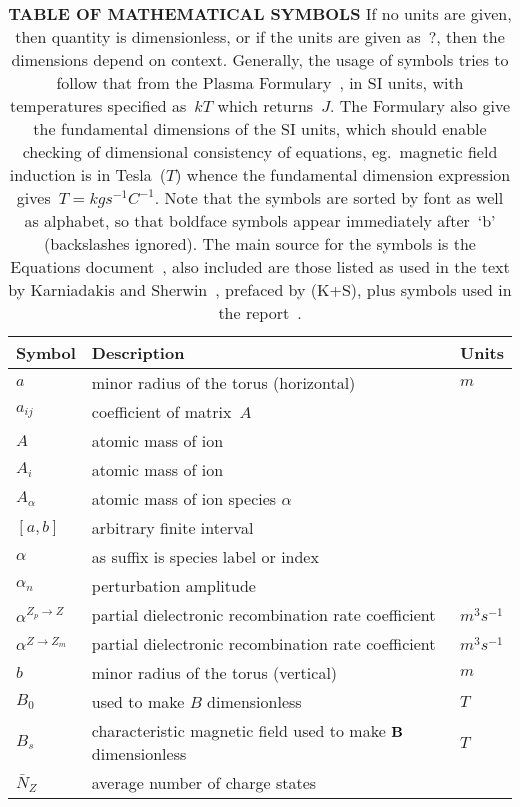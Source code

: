\begin{longtable}{|p{3.0cm}|p{10.0cm}|p{3.0cm}|}
\caption{\textbf{\textsf{TABLE OF MATHEMATICAL SYMBOLS}}
If no units are given, then quantity is dimensionless, or if the units are given as~$?$,
then the dimensions depend on context.
Generally, the usage of symbols tries to follow that from the Plasma Formulary~\cite{NRLpf07},
in SI units, with temperatures specified as~$kT$ which returns~$J$. The Formulary also
give the fundamental dimensions of the SI units, which should enable checking of dimensional consistency of
equations, eg.\ magnetic field induction is in Tesla~($T$) whence the fundamental
dimension expression gives~$T=kg s^{-1} C^{-1}$.
Note that the symbols are sorted by font as well as alphabet, so that boldface symbols
appear immediately after~`b' (backslashes ignored). The main source for the symbols is
the Equations document~\cite{pappeqs8}, also included are those listed as used in the text by
Karniadakis and Sherwin~\cite{karniadakissherwin}, prefaced by (K+S), plus symbols used in the
report~\cite{y2re313}. \label{tab:symbols}
} \\
\hline
\textbf{\textsf{Symbol}} & \textbf{\textsf{Description}}  & \textbf{\textsf{Units}} \\
\hline
$a$ & minor radius of the torus (horizontal) & $m$ \\
$a_{ij}$ & coefficient of matrix~$A$ &  \\
$A$ & atomic mass of ion &  \\
$A_i$ & atomic mass of ion & \\
$A_\alpha$ & atomic mass of ion species $\alpha$ & \\
$[a,b]$ & arbitrary finite interval  & \\
$\alpha$ & as suffix is species label or index &  \\
$\alpha_n$ & perturbation amplitude &  \\
$\alpha^{Z_p\rightarrow Z}$ & partial dielectronic recombination rate coefficient  & $m^3 s^{-1}$  \\
$\alpha^{Z\rightarrow Z_m}$ & partial dielectronic recombination rate coefficient  & $m^3 s^{-1}$  \\
$b$ & minor radius of the torus (vertical) & $m$ \\
$B_0$ & used to make $B$ dimensionless  &  $T$  \\
$B_s$ & characteristic magnetic field used to make ${\bf B}$ dimensionless  &  $T$  \\
$\bar{N}_Z$ & average number of charge states  &   \\

\end{longtable}
